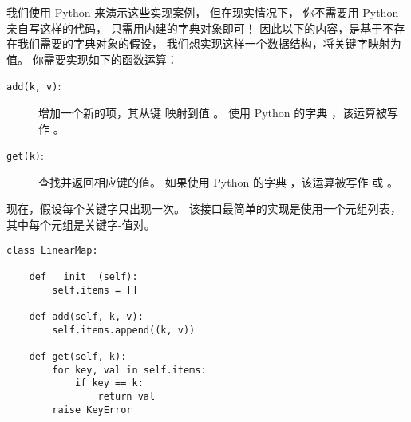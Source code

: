 
我们使用 Python 来演示这些实现案例， 但在现实情况下，
你不需要用 Python 亲自写这样的代码， 只需用内建的字典对象即可！
因此以下的内容，是基于不存在我们需要的字典对象的假设，
我们想实现这样一个数据结构，将关键字映射为值。 你需要实现如下的函数运算：


\begin{description}

\item [{\tt add(k, v)}:] 增加一个新的项，其从键  映射到值 。
使用 Python 的字典 ，该运算被写作 。

\item [{\tt get(k)}:] 查找并返回相应键的值。
如果使用 Python 的字典  ，该运算被写作  或 。

\end{description}


现在，假设每个关键字只出现一次。
该接口最简单的实现是使用一个元组列表， 其中每个元组是关键字-值对。

\begin{lstlisting}
class LinearMap:

    def __init__(self):
        self.items = []

    def add(self, k, v):
        self.items.append((k, v))

    def get(self, k):
        for key, val in self.items:
            if key == k:
                return val
        raise KeyError
\end{lstlisting}

